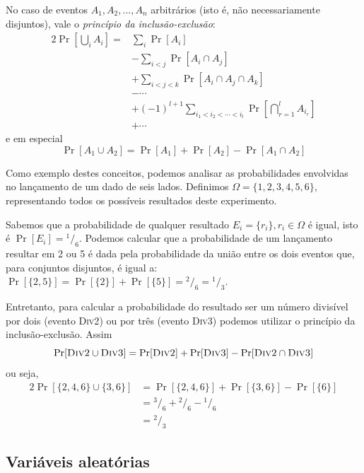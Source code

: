 No caso de eventos $A_1, A_2, ..., A_n$ arbitrários (isto é, não necessariamente disjuntos), vale o \emph{princípio da inclusão-exclusão}:
\begin{alignat*}{2}
    \Pr\left[ \bigcup_i A_i \right] = & \sum_i \Pr[A_i] \\
                                  & - \sum_{i<j} \Pr[A_i \cap A_j] \\
                                  & + \sum_{i<j<k} \Pr[A_i \cap A_j \cap A_k] \\
                                  & - \cdots \\
                                  & + (-1)^{l+1} \sum_{i_1 < i_2 < \cdots < i_l} \Pr \left[ \bigcap_{r=1}^{l} A_{i_r} \right] \\
                                  & + \cdots
\end{alignat*}
e em especial
\[
    \Pr[A_1 \cup A_2] = \Pr[A_1] + \Pr[A_2] - \Pr[A_1 \cap A_2]
\]

Como exemplo destes conceitos, podemos analisar as probabilidades envolvidas no lançamento de um dado de seis lados. Definimos $\Omega = \{1, 2, 3, 4, 5, 6\}$, representando todos os possíveis resultados deste experimento. 

Sabemos que a probabilidade de qualquer resultado $E_i = \{r_i\}, r_i \in \Omega$ é igual, isto é $\Pr[E_i] = {^{1}/_{6}}$. Podemos calcular que a probabilidade de um lançamento resultar em 2 ou 5 é dada pela probabilidade da união entre os dois eventos que, para conjuntos disjuntos, é igual a: $\Pr[\{2, 5\}] = \Pr[\{2\}] + \Pr[\{5\}] = {^2/_6} = {^1/_3}$.

Entretanto, para calcular a probabilidade do resultado ser um número divisível por dois (evento \textsc{Div2}) ou por três (evento \textsc{Div3}) podemos utilizar o princípio da inclusão-exclusão. Assim 
\[
\Pr[\textsc{Div2} \cup \textsc{Div3}] = \Pr[\textsc{Div2}] + \Pr[\textsc{Div3}] - \Pr[\textsc{Div2} \cap \textsc{Div3}]
\]
ou seja,
\begin{alignat*}{2}
\Pr[\{2,4,6\} \cup \{3,6\}] &= \Pr[\{2,4,6\}] + \Pr[\{3,6\}] - \Pr[\{6\}] \\
                            &= {^3/_6} + {^2/_6} - {^1/_6} \\
                            &= {^2/_3}
\end{alignat*}

\subsection{Variáveis aleatórias}

